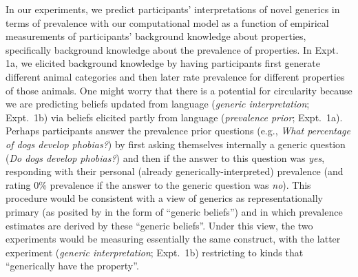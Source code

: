 \documentclass[floatsintext,man]{apa6}
\begin{document}
In our experiments, we predict participants' interpretations of novel generics in terms of prevalence with our computational model as a function of empirical measurements of participants' background knowledge about properties, specifically background knowledge about the prevalence of properties. 
In Expt. 1a, we elicited background knowledge by having participants first generate different animal categories and then later rate prevalence for different properties of those animals.
One might worry that there is a potential for circularity because we are predicting beliefs updated from language (\emph{generic interpretation}; Expt.~1b) via beliefs elicited partly from language (\emph{prevalence prior}; Expt.~1a).
Perhaps participants answer the prevalence prior questions (e.g., \emph{What percentage of dogs develop phobias?}) by first asking themselves internally a generic question (\emph{Do dogs develop phobias?}) and then  if the answer to this question was \emph{yes}, responding with their personal (already generically-interpreted) prevalence (and rating 0\% prevalence if the answer to the generic question was \emph{no}).
This procedure would be consistent with a view of generics as representationally primary (as posited by  in the form of \enquote{generic beliefs}) and in which prevalence estimates are derived by these \enquote{generic beliefs}. 
Under this view, the two experiments would be measuring essentially the same construct, with the latter experiment (\emph{generic interpretation}; Expt.~1b) restricting to  kinds that ``generically have the property''. 
\end{document}
